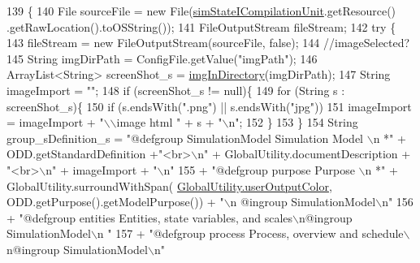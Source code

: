 \begin{DoxyCode}
139                           \{ 
140         File sourceFile = \textcolor{keyword}{new} File(\hyperlink{classit_1_1isislab_1_1masonhelperdocumentation_1_1analizer_1_1_sim_state_analizer_ab9778ffe58c423156222c36e9d0f7c5a}{simStateICompilationUnit}.getResource()
      .getRawLocation().toOSString());
141         FileOutputStream fileStream;
142         \textcolor{keywordflow}{try} \{
143             fileStream = \textcolor{keyword}{new} FileOutputStream(sourceFile, \textcolor{keyword}{false});
144             \textcolor{comment}{//imageSelected?}
145             String imgDirPath = ConfigFile.getValue(\textcolor{stringliteral}{"imgPath"});
146             ArrayList<String> screenShot\_s = \hyperlink{classit_1_1isislab_1_1masonhelperdocumentation_1_1analizer_1_1_sim_state_analizer_a5f11914d44cbe2bac31cee77bb9598f5}{imgInDirectory}(imgDirPath);
147             String imageImport = \textcolor{stringliteral}{""};
148             \textcolor{keywordflow}{if} (screenShot\_s != null)\{
149                 \textcolor{keywordflow}{for} (String s : screenShot\_s)\{
150                     \textcolor{keywordflow}{if} (s.endsWith(\textcolor{stringliteral}{".png"}) || s.endsWith(\textcolor{stringliteral}{"jpg"}))
151                         imageImport = imageImport + \textcolor{stringliteral}{"\(\backslash\)\(\backslash\)image html "} + s + \textcolor{stringliteral}{"\(\backslash\)n"};
152                 \}
153             \}
154             String group\_sDefinition\_s =   \textcolor{stringliteral}{"@defgroup SimulationModel Simulation Model \(\backslash\)n *"} + 
      ODD.getStandardDefinition +\textcolor{stringliteral}{"<br>\(\backslash\)n"} + GlobalUtility.documentDescription + \textcolor{stringliteral}{"<br>\(\backslash\)n"} + imageImport + \textcolor{stringliteral}{"\(\backslash\)n"}
155                     + \textcolor{stringliteral}{"@defgroup purpose Purpose \(\backslash\)n *"} + GlobalUtility.surroundWithSpan(
      \hyperlink{classit_1_1isislab_1_1masonhelperdocumentation_1_1analizer_1_1_global_utility_aec864cd710b27ece609c5a6093211ff4}{GlobalUtility.userOutputColor}, ODD.getPurpose().getModelPurpose()) + \textcolor{stringliteral}{"\(\backslash\)n
      @ingroup SimulationModel\(\backslash\)n"}
156                     + \textcolor{stringliteral}{"@defgroup entities Entities, state variables, and scales\(\backslash\)n@ingroup SimulationModel\(\backslash\)n
      "}
157                     + \textcolor{stringliteral}{"@defgroup process Process, overview and schedule\(\backslash\)n@ingroup SimulationModel\(\backslash\)n"}

\end{DoxyCode}
